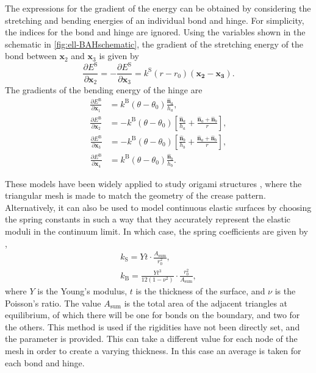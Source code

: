 The expressions for the gradient of the energy can be obtained by considering the stretching and bending energies of an individual bond and hinge.
For simplicity, the indices for the bond and hinge are ignored.
Using the variables shown in the schematic in \cref{fig:ell-BAHschematic}, the gradient of the stretching energy of the bond between $\bm{x}_2$ and $\bm{x}_3$ is given by
\begin{equation}
  \frac{\partial E^\text{S}}{\partial \bm{x}_2} = - \frac{\partial E^\text{S}}{\partial \bm{x}_3} = k^\text{S} (r - r_0) (\bm{x_2} - \bm{x_3}).
\end{equation}
The gradients of the bending energy of the hinge are
\begin{align}
  \frac{\partial E^\text{B}}{\partial \bm{x}_1} &= k^\text{B} (\theta - \theta_0) \frac{\bm{\hat{n}}_a}{h_a}, \\
  \frac{\partial E^\text{B}}{\partial \bm{x}_2} &= - k^\text{B} (\theta - \theta_0) \left[\frac{\bm{\hat{n}}_a}{h_a} + \frac{\bm{\hat{n}}_a + \bm{\hat{n}}_b}{r}\right],
\end{align}
\begin{align}
  \frac{\partial E^\text{B}}{\partial \bm{x}_3} &= - k^\text{B} (\theta - \theta_0) \left[\frac{\bm{\hat{n}}_b}{h_b} + \frac{\bm{\hat{n}}_a + \bm{\hat{n}}_b}{r}\right], \\
  \frac{\partial E^\text{B}}{\partial \bm{x}_4} &= k^\text{B} (\theta - \theta_0) \frac{\bm{\hat{n}}_b}{h_b}.
\end{align}

These models have been widely applied to study origami structures \cite{Liu2017a,Gillman2018,Zhou2023}, where the triangular mesh is made to match the geometry of the crease pattern.
Alternatively, it can also be used to model continuous elastic surfaces by choosing the spring constants in such a way that they accurately represent the elastic moduli in the continuum limit.
In which case, the spring coefficients are given by \cite{Gelder1998,Seung1988,Grinspun2006},
\begin{gather}
  k_\text{S} = Yt \cdot \frac{A_\text{sum}}{r_0^2}, \\
  k_\text{B} = \frac{Yt^3}{12(1-\nu^2)} \cdot \frac{r_0^2}{A_\text{sum}},
\end{gather}
where $Y$ is the Young's modulus, $t$ is the thickness of the surface, and $\nu$ is the Poisson's ratio.
The value $A_\text{sum}$ is the total area of the adjacent triangles at equilibrium, of which there will be one for bonds on the boundary, and two for the others.
This method is used if the rigidities have not been directly set, and the  parameter is provided.
This can take a different value for each node of the mesh in order to create a varying thickness.
In this case an average is taken for each bond and hinge.

